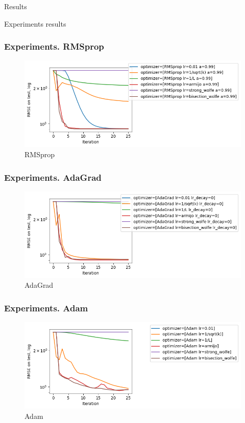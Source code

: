 \documentclass[pdf,10pt]{beamer}
\begin{document}
\begin{section}{Results}
\begin{subsection}{Experiments results}
   \begin{frame}
     \frametitle{Experiments. RMSprop}
     \begin{figure}[H]
       \centering
       \includegraphics[width=\textwidth,keepaspectratio]{../data/rmsprop.png}
       \caption[RMSProp]{RMSprop}\label{fig:rmsprop}
     \end{figure}
   \end{frame}

   \begin{frame}
     \frametitle{Experiments. AdaGrad}
     \begin{figure}[H]
       \centering
       \includegraphics[width=\textwidth,keepaspectratio]{../data/adagrad.png}
       \caption[AdaGrad]{AdaGrad}\label{fig:adagrad}
     \end{figure}
   \end{frame}

   \begin{frame}
     \frametitle{Experiments. Adam}
     \begin{figure}[H]
       \centering
       \includegraphics[width=\textwidth,keepaspectratio]{../data/adam.png}
       \caption[Adam]{Adam}\label{fig:adam}
     \end{figure}
   \end{frame}


\end{subsection}
\end{section}
\end{document}
